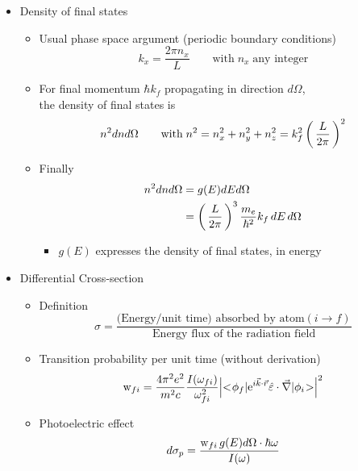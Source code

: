 \documentclass[12pt,letterpaper]{article}
\begin{document}
\begin{Aenumerate}
\begin{itemize}
 \item Density of final states
	\begin{itemize}
	\item Usual phase space argument (periodic boundary conditions)
	\begin{equation*}
	k_x = \frac{2\pi n_x}{L} \quad\quad \text{with} \; n_x \; 
	   \text{any integer}
	\end{equation*}
	\item For final momentum $\hbar k_f$ propagating in direction $d\Omega$, \\
	the density of final states is
	\begin{equation}
	n^2 dn d\Omega \quad\quad \text{with} \; n^2 = n_x^2 + n_y^2 + n_z^2 =
	  k_f^2 \left ( \, \frac{L}{2\pi} \, \right )^2
	\end{equation}
	\item Finally
	\begin{equation}
	\begin{split}
	n^2 dn d\Omega &= g(E) dE d\Omega \\
	               &= \left ( \, \frac{L}{2\pi} \, \right )^3 \frac{m_e}{\hbar^2} k_f 
		         \, dE \, d\Omega\\
	\end{split}
	\end{equation}
		\begin{itemize}
		\item $g(E)$ expresses the density of final states, in energy
		\end{itemize}
	\end{itemize}

\item Differential Cross-section

	\begin{itemize}
	\item Definition
	\begin{equation}
	\sigma = \frac{ \text{(Energy/unit time) absorbed by atom} (i \to f)}{
	  \text{Energy flux of the radiation field}}
	\end{equation}

	\item Transition probability per unit time (without derivation)
	\begin{equation}
	{\rm w}_{fi} = 
	\frac{4 \pi^2 e^2}{m^2 c} 
	  \frac{I(\omega_{fi})}{\omega_{fi}^2} 
	  \Big| {<\negmedspace\phi_f|} {\rm e}^{i \vec k \cdot \vec r} \hat{\varepsilon} \cdot \vec\nabla {|\phi_i\negmedspace>} \Big|^2
	\end{equation}

	\item Photoelectric effect
	\begin{equation}
	d\sigma_p = \frac{{\rm w}_{fi} \, g(E) 
	                  d\Omega \cdot \hbar\omega}{I(\omega)}
	\end{equation}


\end{itemize}
\end{itemize}
\end{Aenumerate}
\end{document}
